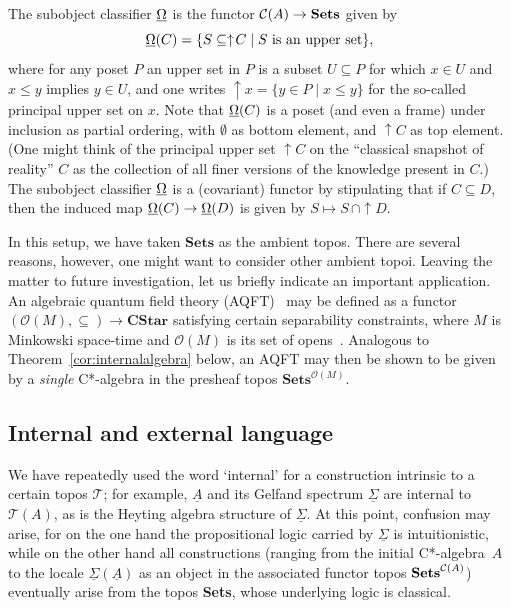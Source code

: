 \documentclass[11pt]{article}
\newcommand{\beq}{\begin{equation}}
\newcommand{\eeq}{\end{equation}}
\newcommand{\Sets}{\mbox{\textbf{Sets}}}
\newcommand{\ca}{C*-algebra} \newcommand{\jba}{JB-algebra}
\newcommand{\raw}{\rightarrow} \newcommand{\rat}{\mapsto}
\newcommand{\CA}{{\mathcal A}} \newcommand{\CB}{{\mathcal B}}
\newcommand{\CT}{{\mathcal T}} \newcommand{\CV}{{\mathcal V}}
\newcommand{\alg}[1]{\ensuremath{#1}}
\newcommand{\functor}[1]{\ensuremath{\underline{#1}}}
\newcommand{\Cat}[1]{\ensuremath{\mathrm{\textbf{#1}}}}
\newcommand{\Cstar}{\Cat{CStar}\xspace}
\newcommand{\Set}{\Cat{Sets}\xspace}
\newcommand{\context}{\ensuremath{\mathcal{C}}}
\newcommand{\asstopos}{\ensuremath{\mathcal{T}}}
\newcommand{\opens}{\ensuremath{\mathcal{O}}}
\newcommand{\uA}{\underline{A}}
\renewcommand{\CA}{\mathcal{C}(A)}
\newcommand{\TA}{\mathcal{T}(A)}
\newcommand{\ulS}{\functor{\Sigma}}
\renewcommand{\TA}{\asstopos(\alg{A})}
\renewcommand{\CA}{\context(\alg{A})}
\begin{document}
The subobject classifier $\underline{\Omega}$ is the functor
$\CA\raw\Sets$ given by
\beq
  \underline{\Om}(\alg{C}) = \{ S \subseteq \uparrow\! C \mid S
  \mbox{ is an upper set}\}, \label{cosieves}
\eeq
where for any poset $P$  an upper set in $P$ is a subset
 $U\subseteq P$ for which $x\in
U$ and $x\leqslant y$ implies $y\in U$, and one writes  $\uparrow\!  x=\{y\in P\mid
x\leqslant y\}$ for the so-called principal upper set on $x$.
Note that $\underline{\Om}(\alg{C})$ is a poset (and even a frame) under inclusion as partial ordering, with
$\emptyset$ as bottom element, and $\uparrow\! C$ as top element.
 (One might 
think of the principal upper set $\uparrow\! C$ on the  ``classical snapshot of reality'' $\alg{C}$ as the collection of all finer versions of the knowledge present in
$\alg{C}$.) The subobject classifier $\underline{\Omega}$ is a
(covariant) functor by stipulating that if $C\subseteq D$, then the induced map $\underline{\Om}(\alg{C})\raw \underline{\Om}(\alg{D})$ is given by $S\mapsto S\, \cap \uparrow\! D$.

In this setup, we have taken $\Set$ as the ambient
  topos.  There are several reasons, however,  one might want to consider other
ambient
  topoi. Leaving the matter to future investigation, let us briefly indicate
 an important application.
  An algebraic quantum field theory (AQFT)~\cite{Haag:LQP} may be defined
as a functor
  \hbox{$(\opens(M), \subseteq) \to \Cstar$} satisfying certain
  separability constraints, where $M$ is Minkowski space-time and
  $\opens(M)$ is its set of
  opens~\cite{BrunettiFredenhagenVerch}. Analogous to
Theorem~\ref{cor:internalalgebra} below, an AQFT may then be shown to be given
by a {\it single}
  C*-algebra in the presheaf topos $\Set^{\opens(M)}$.
\subsection{Internal and external language}\label{Intext}
We have repeatedly used the word `internal' for a construction intrinsic to a
certain topos $\CT$;
for example, $\uA$ and its Gelfand spectrum $\ulS$ are internal to $\TA$, as is
the Heyting algebra
structure of $\ulS$. At this point, confusion may arise, for on the one hand the
propositional logic carried
by $\ulS$ is intuitionistic, while on the other hand all constructions (ranging
from the initial \ca\ $A$ to
the locale $\ulS(\uA)$ as an object in the
associated functor topos $\Sets^{\CA}$)
eventually arise from the topos \Sets, whose underlying logic is classical.
\end{document}
